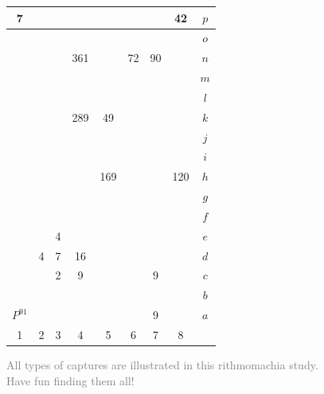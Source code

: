 \documentclass[14pt]{extarticle}
\begin{document}
\begin{figure}[H] 
\centering 
\begin{tabular}{|c|c|c|c|c|c|c|c||c} \hline
\circletfill{\,}7 & \quad  & \quad  & \quad  & \quad  & \quad  & \quad  & \trianglepa{\,}42 & $p$ \\ \hline
\quad  & \quad  & \quad  & \quad  & \quad  & \quad  & \quad  & \quad  & $o$ \\ \hline
\quad  & \quad  & \quad  & \squadfill{\,}361 & \quad  & \trianglepa{\,}72 & \trianglepafill{\,}90 & \quad  & $n$ \\ \hline
\quad  & \quad  & \quad  & \quad  & \quad  & \quad  & \quad  & \quad  & $m$ \\ \hline
\quad  & \quad  & \quad  & \quad  & \quad  & \quad  & \quad  & \quad  & $l$ \\ \hline
\quad  & \quad  & \quad  & \squad{\,}289 & \squadfill{\,}49 & \quad  & \quad  & \quad  & $k$ \\ \hline
\quad  & \quad  & \quad  & \quad  & \quad  & \quad  & \quad  & \quad  & $j$ \\ \hline
\quad  & \quad  & \quad  & \quad  & \quad  & \quad  & \quad  & \quad  & $i$ \\ \hline
\quad  & \quad  & \quad  & \quad  & \squad{\,}169 & \quad  & \quad  & \squadfill{\,}120 & $h$ \\ \hline
\quad  & \quad  & \quad  & \quad  & \quad  & \quad  & \quad  & \quad  & $g$ \\ \hline
\quad  & \quad  & \quad  & \quad  & \quad  & \quad  & \quad  & \quad  & $f$ \\ \hline
\quad  & \quad  & \circlet{\,}4 & \quad  & \quad  & \quad  & \quad  & \quad  & $e$ \\ \hline
\quad  & \circlet{\,}4 & \circletfill{\,}7 & \circlet{\,}16 & \quad  & \quad  & \quad  & \quad  & $d$ \\ \hline
\quad  & \quad  & \circlet{\,}2 & \circletfill{\,}9 & \quad  & \quad  & \trianglepa{\,}9 & \quad  & $c$ \\ \hline
\quad  & \quad  & \quad  & \quad  & \quad  & \quad  & \quad  & \quad  & $b$ \\ \hline
\rhombus{\,}$P^{91}$ & \quad  & \quad  & \quad  & \quad  & \quad  & \circletfill{\,}9 & \quad  & $a$ \\ \hline
1 &  2 &  3 &  4 &  5 &  6 &  7 &  8  &  \\
\end{tabular}
\caption{\textcolor{gray}{All types of captures are illustrated in this rithmomachia study. Have fun finding them all! }}
\label{fig:rithmomachia-numerous-captures-with-pyramid} 
\end{figure}
\end{document}
